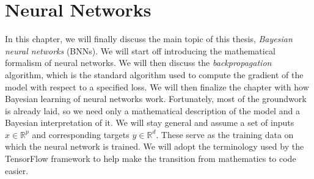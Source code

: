 \section{Neural Networks}\label{sec:neural_networks}
In this chapter, we will finally discuss the main topic of this thesis, \textit{Bayesian neural networks} (BNNs).
We will start off introducing the mathematical formalism of neural networks. 
We will then discuss the \textit{backpropagation} algorithm, which is the standard
algorithm used to compute the gradient of the model with respect to a specified loss. 
We will then finalize the chapter with how Bayesian learning of neural networks work. 
Fortunately, most of the groundwork is already laid, so we need only a mathematical description of the model and a Bayesian interpretation of it. 
We will stay general and assume a set of inputs $x \in \mathbb{R}^p$ and corresponding targets $y \in \mathbb{R}^d$. 
These serve as the training data on which the neural network is trained.
We will adopt the terminology used by the TensorFlow framework \cite{tf} to help make the
transition from mathematics to code easier. 

